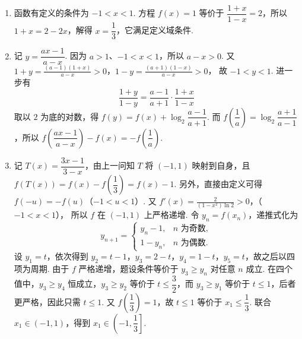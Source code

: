\begin{solution}
\begin{enumerate}
\item 函数有定义的条件为 \(-1<x<1\). 方程 \(f(x)=1\) 等价于 \(\dfrac{1+x}{1-x}=2\)，所以 \(1+x=2-2x\)，解得 \(x=\dfrac13\)，它满足定义域条件.
\item 记 \(y=\dfrac{ax-1}{a-x}\). 因为 \(a>1\)、\(-1<x<1\)，所以 \(a-x>0\). 又
\(1+y=\frac{(a-1)(1+x)}{a-x}>0\)，\(1-y=\frac{(a+1)(1-x)}{a-x}>0\)，
故 \(-1<y<1\). 进一步有
\[
\frac{1+y}{1-y}=\frac{a-1}{a+1}\cdot\frac{1+x}{1-x}
\]
取以 \(2\) 为底的对数，得 \(f(y)=f(x)+\log_2\dfrac{a-1}{a+1}\). 而 \(f\left(\dfrac1a\right)=\log_2\dfrac{a+1}{a-1}\)，所以 \(f\left(\dfrac{ax-1}{a-x}\right)-f(x)=-f\left(\dfrac1a\right)\).
\item 记 \(T(x)=\dfrac{3x-1}{3-x}\)，由上一问知 \(T\) 将 \((-1,1)\) 映射到自身，且 \(f(T(x))=f(x)-f\left(\dfrac13\right)=f(x)-1\). 另外，直接由定义可得 \(f(-u)=-f(u)\)（\(-1<u<1\)）. 又
\(f'(x)=\frac{2}{(1-x^2)\ln 2}>0\)，（\(-1<x<1\)），
所以 \(f\) 在 \((-1,1)\) 上严格递增. 令 \(y_n=f(x_n)\)，递推式化为
\[
y_{n+1}=\begin{cases}
y_n-1,&n\text{ 为奇数},\\
1-y_n,&n\text{ 为偶数}.
\end{cases}
\]
设 \(y_1=t\)，依次得到 \(y_2=t-1\)，\(y_3=2-t\)，\(y_4=1-t\)，\(y_5=t\)，故之后以四项为周期. 由于 \(f\) 严格递增，题设条件等价于 \(y_3\ge y_n\) 对任意 \(n\) 成立. 在四个值中，\(y_3\ge y_4\) 恒成立，\(y_3\ge y_2\) 等价于 \(t\le\dfrac32\)，而 \(y_3\ge y_1\) 等价于 \(t\le1\)，后者更严格，因此只需 \(t\le1\). 又 \(f\left(\dfrac13\right)=1\)，故 \(t\le1\) 等价于 \(x_1\le\dfrac13\). 联合 \(x_1\in(-1,1)\)，得到 \(x_1\in\left(-1,\dfrac13\right]\).
\end{enumerate}
\end{solution}
